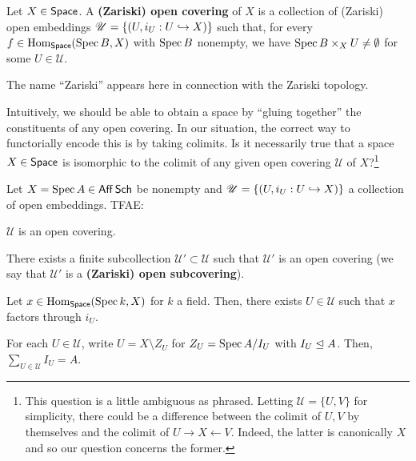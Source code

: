 \documentclass[11pt]{article}
\newcommand{\U}{\mathscr{U}}
\begin{document}
\begin{definition}
Let $X\in\operatorname{\mathsf{Space}}$. A \textbf{(Zariski) open covering} of $X$ is a collection of (Zariski) open embeddings $\U=\{(U,i_U: U\inj X)\}$ such that, for every $f\in\operatorname{Hom}_{\operatorname{\mathsf{Space}}}(\operatorname{Spec} B,X)$ with $\operatorname{Spec} B$ nonempty, we have $\operatorname{Spec} B\times_XU\neq\emptyset$ for some $U\in\U$.
\end{definition}

The name ``Zariski'' appears here in connection with the Zariski topology.

\begin{exercise}
Intuitively, we should be able to obtain a space by ``gluing together'' the constituents of any open covering. In our situation, the correct way to functorially encode this is by taking colimits. Is it necessarily true that a space $X\in\operatorname{\mathsf{Space}}$ is isomorphic to the colimit of any given open covering $\U$ of $X$?\footnote{This question is a little ambiguous as phrased. Letting $\U=\{U,V\}$ for simplicity, there could be a difference between the colimit of $U,V$ by themselves and the colimit of $U\rightarrow X\leftarrow V$. Indeed, the latter is canonically $X$ and so our question concerns the former.}
\end{exercise}

\begin{proposition}
Let $X=\operatorname{Spec} A\in\operatorname{\mathsf{Aff}}\operatorname{\mathsf{Sch}}$ be nonempty and $\U=\{(U,i_U: U\inj X)\}$ a collection of open embeddings. TFAE:
\begin{enum}{\roman}
\item $\U$ is an open covering.

\item There exists a finite subcollection $\U'\subset\U$ such that $\U'$ is an open covering (we say that $\U'$ is a \textbf{(Zariski) open subcovering}).

\item Let $x\in\operatorname{Hom}_{\operatorname{\mathsf{Space}}}(\operatorname{Spec} k,X)$ for $k$ a field. Then, there exists $U\in\U$ such that $x$ factors through $i_U$.

\item For each $U\in\U$, write $U=X\setminus Z_U$ for $Z_U=\operatorname{Spec} A/I_U$ with $I_U\trianglelefteq A$. Then, $\sum_{U\in\U}I_U=A$.
\end{enum}
\end{proposition}
\end{document}
